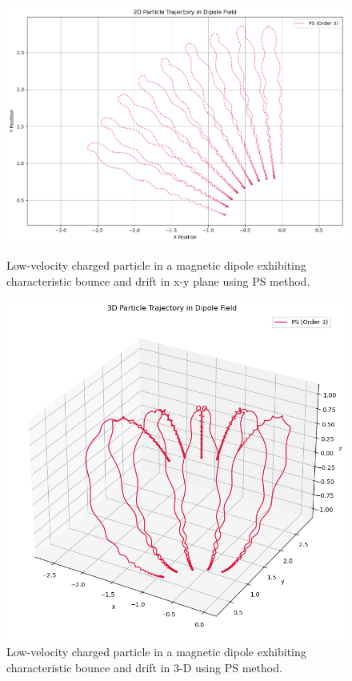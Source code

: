 \documentclass{article}
\begin{document}
    \begin{figure}[H]
        \centering
        \begin{minipage}[t]{0.4\textwidth}
            \centering
            \includegraphics[width=\textwidth]{Images/Dipole/Dipole_slow_PS_Order3_traj_qm2_5000s.png}
            \caption{Low-velocity charged particle in a magnetic dipole exhibiting characteristic bounce and drift in x-y plane using PS method.}
            \label{FIG:Dipole_drift}
        \end{minipage}%
        \hfill
        \begin{minipage}[t]{0.45\textwidth}
            \centering
            \includegraphics[width=\textwidth]{Images/Dipole/Dipole_slow_PS_Order3_3Dtraj_qm2_5000s.png}
            \caption{Low-velocity charged particle in a magnetic dipole exhibiting characteristic bounce and drift in 3-D using PS method.}
            \label{FIG:Dipole_bounce}
        \end{minipage}
    \end{figure}
\end{document}
